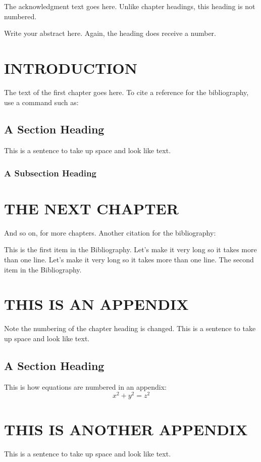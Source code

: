 \documentclass{thesis}
\author{Benjamin Pringle}
\begin{document}
\titlepage             %
\tableofcontents       %
\listoftables          %
\listoffigures         %

The acknowledgment text goes here. Unlike chapter headings,
this heading is not numbered.

Write your abstract here. Again, the heading does receive a number.

\chapter{INTRODUCTION}
The text of the first chapter goes here. To cite a reference for the
bibliography, use a command such as:\cite{thisbook}
\section{A Section Heading}
This is a sentence to take up space and look like text.
\subsection{A Subsection Heading}

\chapter{THE NEXT CHAPTER}
And so on, for more chapters.
Another citation for the bibliography:\cite{anotherbook}

\begin{singlespace}
\begin{thebibliography}{99}
 This is the first item in the Bibliography.
Let's make it very long so it takes more than one line.
Let's make it very long so it takes more than one line.
 The second item in the Bibliography.
\end{thebibliography}
\end{singlespace}

\appendix    %
\chapter{THIS IS AN APPENDIX}
Note the numbering of the chapter heading is changed.
This is a sentence to take up space and look like text.
\section{A Section Heading}
This is how equations are numbered in an appendix:
\begin{equation}
x^2 + y^2 = z^2
\end{equation}

\chapter{THIS IS ANOTHER APPENDIX}
This is a sentence to take up space and look like text.
\end{document}
